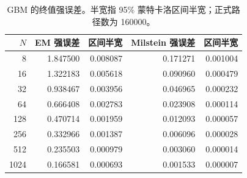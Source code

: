\begin{table}[htbp]\centering\small
\caption{GBM 的终值强误差。半宽指 95\% 蒙特卡洛区间半宽；正式路径数为 160000。}\label{tab:results-gbm-strong}
\begin{tabular}{rrrrr}\toprule
$N$ & EM 强误差 & 区间半宽 & Milstein 强误差 & 区间半宽\\\midrule
8 & 1.847500 & 0.008087 & 0.171271 & 0.001004\\
16 & 1.322183 & 0.005618 & 0.090960 & 0.000479\\
32 & 0.938467 & 0.003956 & 0.046965 & 0.000232\\
64 & 0.666408 & 0.002783 & 0.023908 & 0.000114\\
128 & 0.470714 & 0.001959 & 0.012093 & 0.000057\\
256 & 0.332966 & 0.001387 & 0.006096 & 0.000028\\
512 & 0.235503 & 0.000979 & 0.003060 & 0.000014\\
1024 & 0.166581 & 0.000693 & 0.001533 & 0.000007\\
\bottomrule
\end{tabular}
\end{table}
